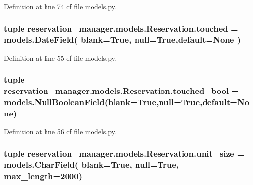Definition at line 74 of file models.\-py.

\hypertarget{classreservation__manager_1_1models_1_1Reservation_a8ee73ba43a314afaf611e4fe84533242}{
\subsubsection[{touched}]{\setlength{\rightskip}{0pt plus 5cm}tuple reservation\-\_\-manager.\-models.\-Reservation.\-touched = models.\-Date\-Field( blank=True, null=True,default=None )\hspace{0.3cm}{\ttfamily [static]}}}\label{classreservation__manager_1_1models_1_1Reservation_a8ee73ba43a314afaf611e4fe84533242}


Definition at line 55 of file models.\-py.

\hypertarget{classreservation__manager_1_1models_1_1Reservation_ad77ac02ca8b0e2f125a00ccb04e03589}{
\subsubsection[{touched\-\_\-bool}]{\setlength{\rightskip}{0pt plus 5cm}tuple reservation\-\_\-manager.\-models.\-Reservation.\-touched\-\_\-bool = models.\-Null\-Boolean\-Field(blank=True,null=True,default=None)\hspace{0.3cm}{\ttfamily [static]}}}\label{classreservation__manager_1_1models_1_1Reservation_ad77ac02ca8b0e2f125a00ccb04e03589}


Definition at line 56 of file models.\-py.

\hypertarget{classreservation__manager_1_1models_1_1Reservation_ac1fd20bad3887df3154f1304ddb19082}{
\subsubsection[{unit\-\_\-size}]{\setlength{\rightskip}{0pt plus 5cm}tuple reservation\-\_\-manager.\-models.\-Reservation.\-unit\-\_\-size = models.\-Char\-Field( blank=True, null=True, max\-\_\-length=2000)\hspace{0.3cm}{\ttfamily [static]}}}\label{classreservation__manager_1_1models_1_1Reservation_ac1fd20bad3887df3154f1304ddb19082}


